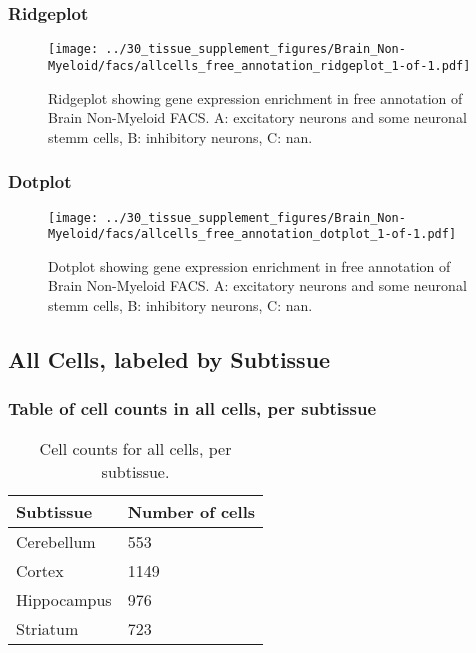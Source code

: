 \newpage
\newpage
\subsubsection{Ridgeplot}
\begin{figure}[h]
\centering
\texttt{[image: ../30\_tissue\_supplement\_figures/Brain\_Non-Myeloid/facs/allcells\_free\_annotation\_ridgeplot\_1-of-1.pdf]}

\caption{ Ridgeplot  showing gene expression enrichment in free annotation of Brain Non-Myeloid FACS. A: excitatory neurons and some neuronal stemm cells, B: inhibitory neurons, C: nan.}
\end{figure}


\newpage
\newpage
\subsubsection{Dotplot}
\begin{figure}[h]
\centering
\texttt{[image: ../30\_tissue\_supplement\_figures/Brain\_Non-Myeloid/facs/allcells\_free\_annotation\_dotplot\_1-of-1.pdf]}

\caption{ Dotplot  showing gene expression enrichment in free annotation of Brain Non-Myeloid FACS. A: excitatory neurons and some neuronal stemm cells, B: inhibitory neurons, C: nan.}
\end{figure}


\newpage
\subsection{All Cells, labeled by Subtissue}
\subsubsection{Table of cell counts in all cells, per subtissue}\begin{table}[h]
\centering
\label{my-label}
\begin{tabular}{@{}ll@{}}
\toprule

Subtissue& Number of cells \\ \midrule
Cerebellum & 553 \\

Cortex & 1149 \\

Hippocampus & 976 \\

Striatum & 723 \\
\bottomrule
\end{tabular}
\caption{Cell counts for all cells, per subtissue.}
\end{table}

